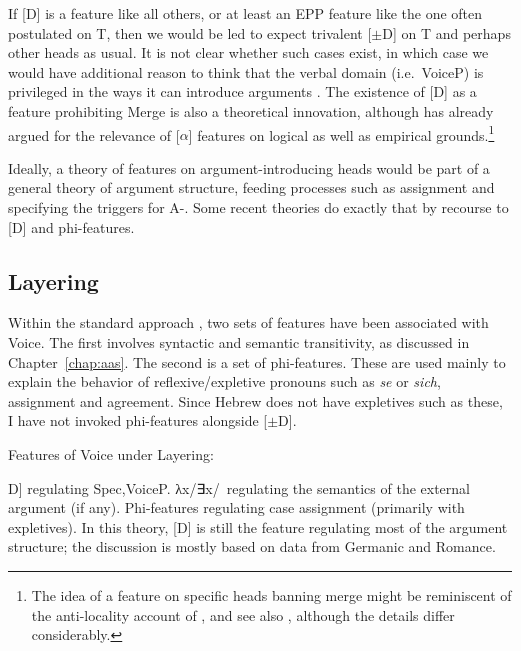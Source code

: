 \begin{exe}
\begin{xlist}
\begin{xlist}
\begin{xlist}
\begin{xlist}
\begin{xlist}
\begin{xlist}
\begin{exe}
\begin{xlist}
\begin{exe}
\begin{exe}
\begin{xlist}
\begin{exe}
\begin{exe}
\begin{xlist}
\begin{exe}
\begin{xlist}
\begin{exe}
\begin{xlist}
\begin{exe}
\begin{xlist}
\begin{exe}
\begin{xlist}
\label{r1:g:2c1}If [D] is a feature like all others, or at least an EPP feature like the one often postulated on T, then we would be led to expect trivalent [$\pm$D] on T and perhaps other heads as usual. It is not clear whether such cases exist, in which case we would have additional reason to think that the verbal domain (i.e.~VoiceP) is privileged in the ways it can introduce arguments \citep{grimshaw00,woodmarantz17}. The existence of [\textminus{}D] as a feature prohibiting Merge is also a theoretical innovation, although \cite{harbour11,harbour14} has already argued for the relevance of [\textminus{}$\alpha$] features on logical as well as empirical grounds.\footnote{The idea of a feature on specific heads banning merge might be reminiscent of the anti-locality account of \cite{grohmann03}, and see also \cite{baier18phd}, although the details differ considerably.}

Ideally, a theory of features on argument-introducing heads would be part of a general theory of argument structure, feeding processes such as  assignment and specifying the triggers for A-. Some recent theories do exactly that by recourse to [D] and phi-features.

	\subsection{Layering}
Within the standard  approach \citep{schaefer08,schaefer12,schaefer17oup}, two sets of features have been associated with Voice. The first involves syntactic and semantic transitivity, as discussed in Chapter~\ref{chap:aas}. The second is a set of phi-features. These are used mainly to explain the behavior of reflexive/expletive pronouns such as  \emph{se} or  \emph{sich},  assignment and agreement. Since Hebrew does not have expletives such as these, I have not invoked phi-features alongside [$\pm$D].
 \begin{exe}
 \ex  Features of Voice under Layering: 
 \begin{xlist} 
 	\ex  {[}D] regulating Spec,VoiceP. 
 	\ex  λx/∃x/\zero~regulating the semantics of the external argument (if any). 
 	\ex  Phi-features regulating case assignment (primarily with expletives). 
 \z
\z 
In this theory, [D] is still the feature regulating most of the argument structure; the discussion is mostly based on data from Germanic and Romance.


\end{xlist}
\end{exe}
\end{xlist}
\end{exe}
\end{xlist}
\end{exe}
\end{xlist}
\end{exe}
\end{xlist}
\end{exe}
\end{xlist}
\end{exe}
\end{exe}
\end{xlist}
\end{exe}
\end{exe}
\end{xlist}
\end{exe}
\end{xlist}
\end{xlist}
\end{xlist}
\end{xlist}
\end{xlist}
\end{xlist}
\end{exe}
